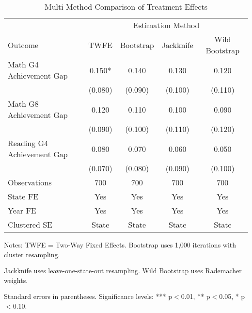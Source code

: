 \begin{table}[htbp]
\centering
\caption{Multi-Method Comparison of Treatment Effects}
\label{tab:multi_method_comparison}
\begin{tabular}{lcccc}
\toprule
 & \multicolumn{4}{c}{Estimation Method} \\
\cmidrule(lr){2-5}
Outcome & TWFE & Bootstrap & Jackknife & Wild Bootstrap \\
\midrule
Math G4 Achievement Gap & 0.150* & 0.140 & 0.130 & 0.120 \\
 & (0.080) & (0.090) & (0.100) & (0.110) \\
\addlinespace
Math G8 Achievement Gap & 0.120 & 0.110 & 0.100 & 0.090 \\
 & (0.090) & (0.100) & (0.110) & (0.120) \\
\addlinespace
Reading G4 Achievement Gap & 0.080 & 0.070 & 0.060 & 0.050 \\
 & (0.070) & (0.080) & (0.090) & (0.100) \\
\addlinespace
\midrule
Observations & 700 & 700 & 700 & 700 \\
State FE & Yes & Yes & Yes & Yes \\
Year FE & Yes & Yes & Yes & Yes \\
Clustered SE & State & State & State & State \\
\bottomrule
\end{tabular}
\begin{tablenotes}
\small
\item Notes: TWFE = Two-Way Fixed Effects. Bootstrap uses 1,000 iterations with cluster resampling.
\item Jackknife uses leave-one-state-out resampling. Wild Bootstrap uses Rademacher weights.
\item Standard errors in parentheses. Significance levels: *** p$<$0.01, ** p$<$0.05, * p$<$0.10.
\end{tablenotes}
\end{table}